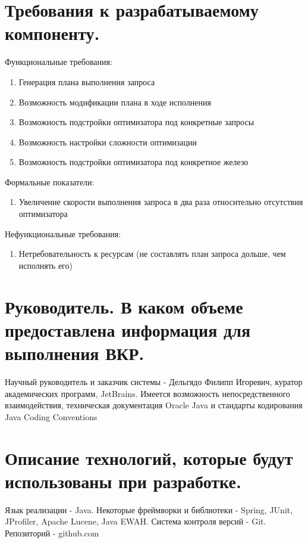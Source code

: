 \documentclass[12pt]{article}
\begin{document}
    \section{Требования к разрабатываемому компоненту.}
        Функциональные требования:
        \begin{enumerate}\itemsep1pt \parskip0pt 
            \item Генерация плана выполнения запроса
            \item Возможность модификации плана в ходе исполнения
            \item Возможность подстройки оптимизатора под конкретные запросы
            \item Возможность настройки сложности оптимизации
            \item Возможность подстройки оптимизатора под конкретное железо
        \end{enumerate}
        
        Формальные показатели: %
        \begin{enumerate}\itemsep1pt \parskip0pt  
            \item Увеличение скорости выполнения запроса в два раза относительно отсутствия оптимизатора
        \end{enumerate}
        
        Нефункциональные требования: %
        \begin{enumerate}\itemsep1pt \parskip0pt  
            \item Нетребовательность к ресурсам (не составлять план запроса дольше, чем исполнять его)
        \end{enumerate}
    \section{Руководитель. В каком объеме предоставлена информация для выполнения ВКР.}
        Научный руководитель и заказчик системы - Дельгядо Филипп Игоревич, куратор академических программ, JetBrains. Имеется возможность непосредственного взаимодействия, техническая документация Oracle Java и стандарты кодирования Java Coding Conventions
    \section{Описание технологий, которые будут использованы при разработке.}
        Язык реализации - Java. Некоторые фреймворки и библиотеки - Spring, JUnit, JProfiler, Apache Lucene, Java EWAH. Система контроля версий - Git. Репозиторий - github.com 
\end{document}
